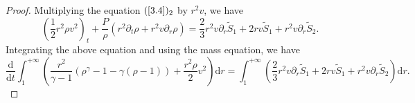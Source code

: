 \documentclass[10pt,reqno]{amsart}
\numberwithin{equation}{section}
\begin{document}
	\begin{proof}
		Multiplying the equation $(\ref{3.4})_2$ by $r^2 v$, we have
		\begin{equation}\nonumber
			(\frac{1}{2}r^2 \rho v^2)_t+\frac{P}{\rho}(r^2 \partial_t\rho+r^2 v \partial_r\rho)=\frac{2}{3}r^2v\partial_{r}\tilde{S}_1+2rv\tilde{S}_1+r^2v\partial_{r}\tilde{S}_2.
		\end{equation}
		Integrating the above equation and using the mass equation, we have
		\begin{equation}\label{0-1}
			\frac{\mathrm{d}}{\mathrm{d} t} \int_{1}^{+\infty}\left(
			\frac{r^2}{\gamma-1}(\rho^{\gamma}-1-\gamma(\rho-1))+\frac{r^2 \rho}{2} v^2\right)\mathrm{d} r=
			\int_{1}^{+\infty}(\frac{2}{3}r^2v\partial_{r}\tilde{S}_1+2rv\tilde{S}_1
			+r^2v\partial_{r}\tilde{S}_2)\mathrm{d} r.
		\end{equation}
		

\end{proof}
\end{document}
